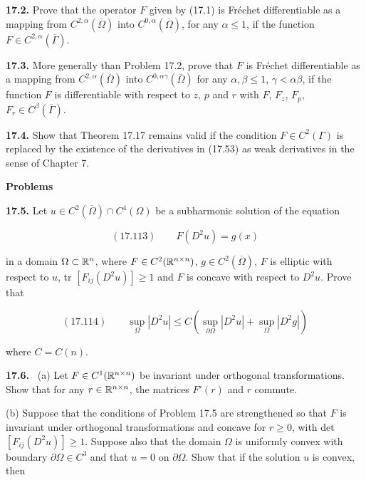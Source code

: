 \medskip

\noindent\textbf{17.2.} \quad Prove that the operator $F$ given by (17.1) is Fr\'echet differentiable as a
mapping from $C^{2,\alpha}(\overline{\Omega})$ into $C^{0,\alpha}(\overline{\Omega})$, for any $\alpha \leq 1$, if the function $F \in C^{2,\alpha}(\overline{\Gamma})$.

\medskip

\noindent\textbf{17.3.} \quad More generally than Problem 17.2, prove that $F$ is Fr\'echet differentiable as
a mapping from $C^{2,\alpha}(\overline{\Omega})$ into $C^{0,\alpha\gamma}(\overline{\Omega})$ for any $\alpha, \beta \leq 1$, $\gamma < \alpha\beta$, if the function $F$ is
differentiable with respect to $z$, $p$ and $r$ with $F$, $F_z$, $F_p$, $F_r \in C^{\beta}(\overline{\Gamma})$.

\medskip

\noindent\textbf{17.4.} \quad Show that Theorem 17.17 remains valid if the condition $F \in C^{2}(\Gamma)$ is
replaced by the existence of the derivatives in (17.53) as weak derivatives in the
sense of Chapter 7.


\textbf{Problems}

\textbf{17.5.} Let $u \in C^2(\overline{\Omega}) \cap C^4(\Omega)$ be a subharmonic solution of the equation

\begin{equation}
(17.113) \qquad F(D^2u) = g(x)
\end{equation}

in a domain $\Omega \subset \mathbb{R}^n$, where $F \in C^2(\mathbb{R}^{n \times n})$, $g \in C^2(\overline{\Omega})$, $F$ is elliptic with respect to $u$,
tr $[F_{ij}(D^2u)] \ge 1$ and $F$ is concave with respect to $D^2u$. Prove that

\begin{equation}
(17.114) \qquad \sup_{\Omega} |D^2u| \le C\!\left(\sup_{\partial\Omega} |D^2u| + \sup_{\Omega} |D^2g|\right)
\end{equation}

where $C = C(n)$.

\textbf{17.6.} \ (a) Let $F \in C^1(\mathbb{R}^{n \times n})$ be invariant under orthogonal transformations. Show
that for any $r \in \mathbb{R}^{n \times n}$, the matrices $F'(r)$ and $r$ commute.

\hspace{1.7em}(b) Suppose that the conditions of Problem 17.5 are strengthened so that $F$ is
invariant under orthogonal transformations and concave for $r \ge 0$, with det
$[F_{ij}(D^2u)] \ge 1$. Suppose also that the domain $\Omega$ is uniformly convex with boundary
$\partial\Omega \in C^3$ and that $u = 0$ on $\partial\Omega$. Show that if the solution $u$ is convex, then


